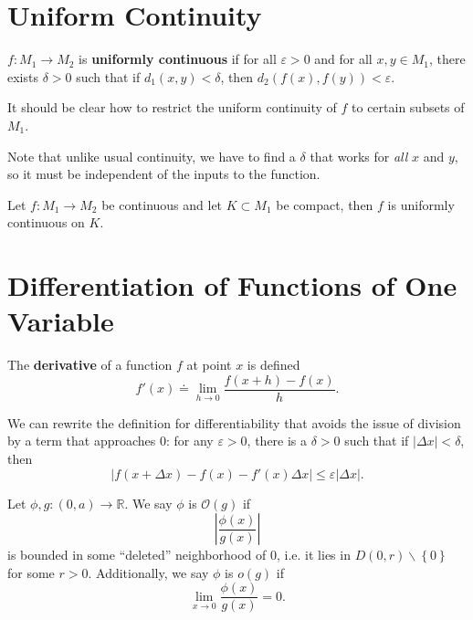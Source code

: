\documentclass[10pt]{report}
\begin{document}

\section{Uniform Continuity}
\begin{defn}[]
	$f:M_1 \to M_2$ is \textbf{uniformly continuous} if for all $\varepsilon>0$ and for all $x,y \in M_1$, there exists $\delta>0$ such that if $d_1(x,y) < \delta$, then $d_2(f(x), f(y)) < \varepsilon$.
\end{defn}

It should be clear how to restrict the uniform continuity of $f$ to certain subsets of $M_1$.

Note that unlike usual continuity, we have to find a $\delta$ that works for \textit{all} $x$ and $y$, so it must be independent of the inputs to the function.

\begin{thrm}[]
Let $f:M_1\to M_2$ be continuous and let $K \subset M_1$ be compact, then $f$ is uniformly continuous on $K$.
\end{thrm}


\section{Differentiation of Functions of One Variable}
\begin{defn}[]
The \textbf{derivative} of a function $f$ at point $x$ is defined
\[
	f'(x) \doteq \lim_{h \to 0} \frac{f(x+h)-f(x)}{h}.
\] 
\end{defn}

We can rewrite the definition for differentiability that avoids the issue of division by a term that approaches 0: for any $\varepsilon>0$, there is a $\delta>0$ such that if $|\Delta x|< \delta$, then
\[
	|f(x + \Delta x) - f(x) - f'(x) \Delta x| \leq \varepsilon |\Delta x|.
\] 

\begin{defn}[]
	Let $\phi,g:(0,a) \to \mathbb{R}$. We say $\phi$ is $\mathcal{O}(g)$ if
	 \[
		 \left|\frac{\phi(x)}{g(x)} \right|
	 \] is bounded in some ``deleted'' neighborhood of 0, i.e. it lies in $D(0,r)\backslash\left\{ 0 \right\}$ for some $r>0$. Additionally, we say $\phi$ is $o(g)$ if \[\lim_{x \to 0} \frac{\phi(x)}{g(x)} = 0.\]
\end{defn}
\end{document}
